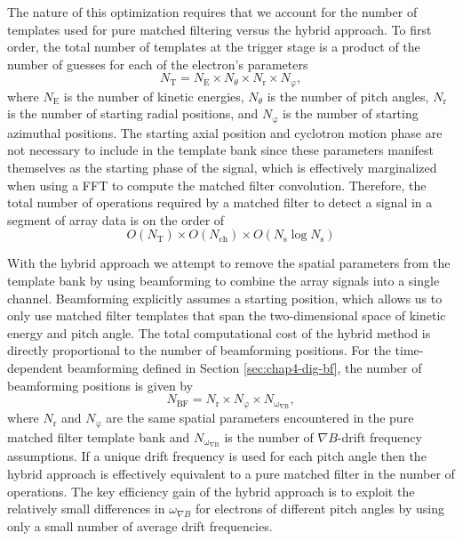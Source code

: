The nature of this optimization requires that we account for the number of templates used for pure matched filtering versus the hybrid approach. To first order, the total number of templates at the trigger stage is a product of the number of guesses for each of the electron's parameters
\begin{equation}
    N_\mathrm{T}=N_\mathrm{E}\times N_\theta \times N_\mathrm{r} \times N_\mathrm{\varphi},
\end{equation}
where $N_\mathrm{E}$ is the number of kinetic energies, $N_\theta$ is the number of pitch angles, $N_\mathrm{r}$ is the number of starting radial positions, and $N_\mathrm{\varphi}$ is the number of starting azimuthal positions. The starting axial position and cyclotron motion phase are not necessary to include in the template bank since these parameters manifest themselves as the starting phase of the signal, which is effectively marginalized when using a FFT to compute the matched filter convolution. Therefore, the total number of operations required by a matched filter to detect a signal in a segment of array data is on the order of 
\begin{equation}
    O(N_\mathrm{T})\times O(N_\mathrm{ch})\times O(N_\mathrm{s}\log{N_\mathrm{s}})
    \label{eq:chap4-tot-ops-pure-mf}
\end{equation}

With the hybrid approach we attempt to remove the spatial parameters from the template bank by using beamforming to combine the array signals into a single channel. Beamforming explicitly assumes a starting position, which allows us to only use matched filter templates that span the two-dimensional space of kinetic energy and pitch angle. The total computational cost of the hybrid method is directly proportional to the number of beamforming positions. For the time-dependent beamforming defined in Section \ref{sec:chap4-dig-bf}, the number of beamforming positions is given by 
\begin{equation}
    N_\mathrm{BF}=N_\mathrm{r}\times N_\mathrm{\varphi}\times N_\mathrm{\omega_{\nabla B}},
\end{equation}
where $N_\mathrm{r}$ and $N_\mathrm{\varphi}$ are the same spatial parameters encountered in the pure matched filter template bank and $N_\mathrm{\omega_{\nabla B}}$ is the number of $\nabla B$-drift frequency assumptions. If a unique drift frequency is used for each pitch angle then the hybrid approach is effectively equivalent to a pure matched filter in the number of operations. The key efficiency gain of the hybrid approach is to exploit the relatively small differences in $\omega_{\nabla B}$ for electrons of different pitch angles by using only a small number of average drift frequencies. 

